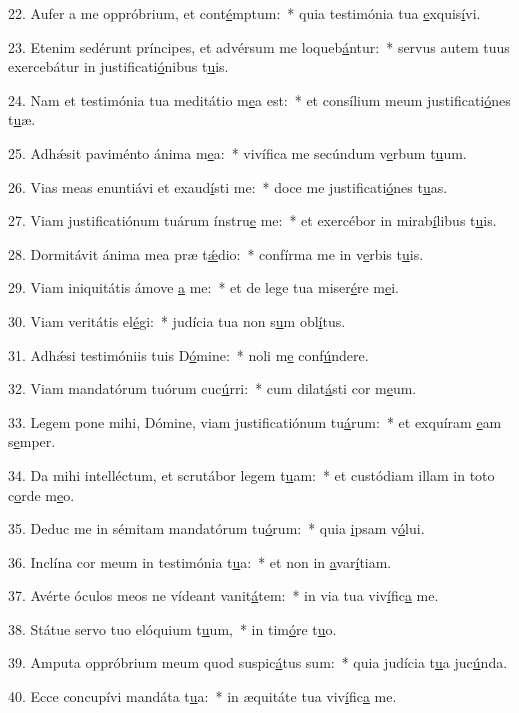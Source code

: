 22. Aufer a me oppróbrium, et cont\uline{é}mptum:~* quia testimónia tua \uline{e}xquis\uline{í}vi.\par 
23. Etenim sedérunt príncipes, et advérsum me loqueb\uline{á}ntur:~* servus autem tuus exercebátur in justificati\uline{ó}nibus t\uline{u}is.\par 
24. Nam et testimónia tua meditátio m\uline{e}a est:~* et consílium meum justificati\uline{ó}nes t\uline{u}æ.\par 
25. Adhǽsit paviménto ánima m\uline{e}a:~* vivífica me secúndum v\uline{e}rbum t\uline{u}um.\par 
26. Vias meas enuntiávi et exaud\uline{í}sti me:~* doce me justificati\uline{ó}nes t\uline{u}as.\par 
27. Viam justificatiónum tuárum ínstru\uline{e} me:~* et exercébor in mirab\uline{í}libus t\uline{u}is.\par 
28. Dormitávit ánima mea præ t\uline{ǽ}dio:~* confírma me in v\uline{e}rbis t\uline{u}is.\par 
29. Viam iniquitátis ámove \uline{a} me:~* et de lege tua miser\uline{é}re m\uline{e}i.\par 
30. Viam veritátis el\uline{é}gi:~* judícia tua non s\uline{u}m obl\uline{í}tus.\par 
31. Adhǽsi testimóniis tuis D\uline{ó}mine:~* noli m\uline{e} conf\uline{ú}ndere.\par 
32. Viam mandatórum tuórum cuc\uline{ú}rri:~* cum dilat\uline{á}sti cor m\uline{e}um.\par 
33. Legem pone mihi, Dómine, viam justificatiónum tu\uline{á}rum:~* et exquíram \uline{e}am s\uline{e}mper.\par 
34. Da mihi intelléctum, et scrutábor legem t\uline{u}am:~* et custódiam illam in toto c\uline{o}rde m\uline{e}o.\par 
35. Deduc me in sémitam mandatórum tu\uline{ó}rum:~* quia \uline{i}psam v\uline{ó}lui.\par 
36. Inclína cor meum in testimónia t\uline{u}a:~* et non in \uline{a}var\uline{í}tiam.\par 
37. Avérte óculos meos ne vídeant vanit\uline{á}tem:~* in via tua viv\uline{í}fic\uline{a} me.\par 
38. Státue servo tuo elóquium t\uline{u}um,~* in tim\uline{ó}re t\uline{u}o.\par 
39. Amputa oppróbrium meum quod suspic\uline{á}tus sum:~* quia judícia t\uline{u}a juc\uline{ú}nda.\par 
40. Ecce concupívi mandáta t\uline{u}a:~* in æquitáte tua viv\uline{í}fic\uline{a} me.\par 

